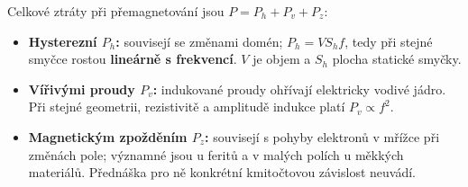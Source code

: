Celkové ztráty při přemagnetování jsou $P=P_h+P_v+P_z$:
\begin{itemize}
\item \textbf{Hysterezní $P_h$:} souvisejí se změnami domén; $P_h=VS_hf$, tedy při stejné smyčce rostou \textbf{lineárně s frekvencí}. $V$ je objem a $S_h$ plocha statické smyčky.
\item \textbf{Vířivými proudy $P_v$:} indukované proudy ohřívají elektricky vodivé jádro. Při stejné geometrii, rezistivitě a amplitudě indukce platí \textbf{$P_v\propto f^2$}.
\item \textbf{Magnetickým zpožděním $P_z$:} souvisejí s pohyby elektronů v mřížce při změnách pole; významné jsou u feritů a v malých polích u měkkých materiálů. Přednáška pro ně konkrétní kmitočtovou závislost neuvádí.
\end{itemize}
